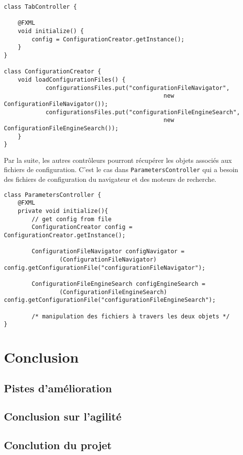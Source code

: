 \documentclass[10pt,a4paper]{article}
\begin{document}
\newpage

\begin{lstlisting}
class TabController {

    @FXML
    void initialize() {
	    config = ConfigurationCreator.getInstance();
    }
}

class ConfigurationCreator {
    void loadConfigurationFiles() {
	    	configurationsFiles.put("configurationFileNavigator", 
		                                      new ConfigurationFileNavigator());
		    configurationsFiles.put("configurationFileEngineSearch", 
		                                      new ConfigurationFileEngineSearch());
	}
}
\end{lstlisting}

Par la suite, les autres contrôleurs pourront récupérer les objets associés aux fichiers de configuration. C'est le cas dans \verb|ParametersController| qui a besoin des fichiers de configuration du navigateur et des moteurs de recherche.

\begin{lstlisting}
class ParametersController {
    @FXML
    private void initialize(){
        // get config from file
        ConfigurationCreator config = ConfigurationCreator.getInstance();

        ConfigurationFileNavigator configNavigator = 
        		(ConfigurationFileNavigator) config.getConfigurationFile("configurationFileNavigator");
        
        ConfigurationFileEngineSearch configEngineSearch =
        		(ConfigurationFileEngineSearch) config.getConfigurationFile("configurationFileEngineSearch");
        		
        /* manipulation des fichiers à travers les deux objets */
}
\end{lstlisting}  

\section{Conclusion}
\subsection{Pistes d'amélioration}

\subsection{Conclusion sur l'agilité}

\subsection{Conclution du projet}
\end{document}
